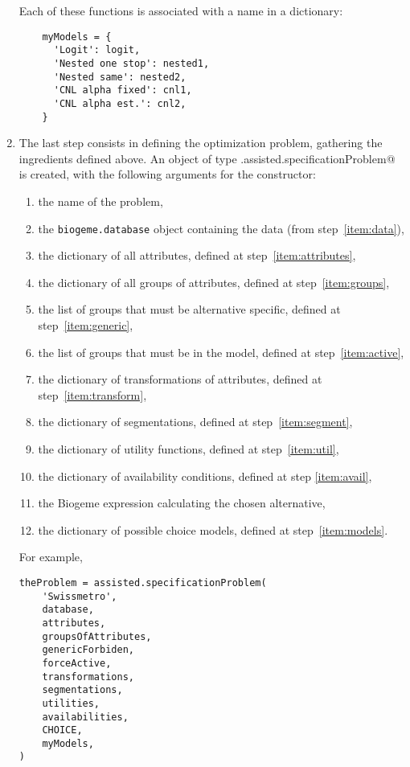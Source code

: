 \documentclass[12pt,a4paper]{article}
\begin{document}
\begin{enumerate}
  
  Each of these functions is associated with a name in a
  dictionary:
  \begin{lstlisting}
    myModels = {
      'Logit': logit,
      'Nested one stop': nested1,
      'Nested same': nested2,
      'CNL alpha fixed': cnl1,
      'CNL alpha est.': cnl2,
    }
  \end{lstlisting}
\item The last step consists in defining the optimization problem,
  gathering the ingredients defined above. An object of type
  \lstinline@biogeme.assisted.specificationProblem@ is created, with
  the following arguments for the constructor:
  \begin{enumerate}
  \item the name of the problem,
  \item the \lstinline{biogeme.database} object containing the data
    (from step~\ref{item:data}),
  \item the dictionary of all attributes, defined at
    step~\ref{item:attributes},
  \item the dictionary of all groups of attributes, defined at
    step~\ref{item:groups},
  \item the list of groups that must be alternative specific,
    defined at step~\ref{item:generic},
  \item the list of groups that must be in the model, defined at
    step~\ref{item:active},
  \item the dictionary of transformations of attributes, defined
    at step~\ref{item:transform},
  \item the dictionary of segmentations, defined at step~\ref{item:segment},
  \item the dictionary of utility functions, defined at
    step~\ref{item:util},
  \item the dictionary of availability conditions, defined at
    step \ref{item:avail},
  \item the Biogeme expression calculating the chosen alternative,
  \item the dictionary of possible choice models, defined
    at step~\ref{item:models}.
  \end{enumerate}
  For example,
  \begin{lstlisting}
theProblem = assisted.specificationProblem(
    'Swissmetro',
    database,
    attributes,
    groupsOfAttributes,
    genericForbiden,
    forceActive,
    transformations,
    segmentations,
    utilities,
    availabilities,
    CHOICE,
    myModels,
)
  \end{lstlisting}
\end{enumerate}
\end{document}
